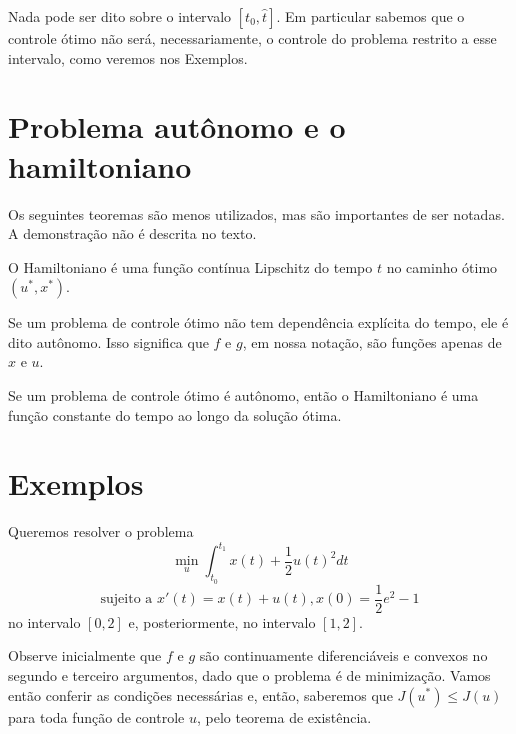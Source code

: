 \begin{remark}
    Nada pode ser dito sobre o intervalo $[t_0, \hat{t}]$. Em particular sabemos que o controle ótimo não será, necessariamente, o controle do problema restrito a esse intervalo, como veremos nos Exemplos. 
\end{remark}

\section{Problema autônomo e o hamiltoniano}

Os seguintes teoremas são menos utilizados, mas são importantes de ser notadas. A demonstração não é descrita no texto. 

\begin{theorem}
    O Hamiltoniano é uma função contínua Lipschitz do tempo $t$ no caminho
    ótimo $(u^*, x^*)$. 
\end{theorem}

\begin{definition}[Autônomo]
    Se um problema de controle ótimo não tem dependência explícita do tempo,
    ele é dito autônomo. Isso significa que $f$ e $g$, em nossa notação, são
    funções apenas de $x$ e $u$. 
\end{definition}

\begin{theorem}
    Se um problema de controle ótimo é autônomo, então o Hamiltoniano é uma
    função constante do tempo ao longo da solução ótima. 
\end{theorem}

\section{Exemplos}

\begin{example}
    Queremos resolver o problema 
    $$
    \min_u \int_{t_0}^{t_1} x(t) + \frac{1}{2}u(t)^2 dt
    $$
    $$  
    \text{sujeito a  }x'(t) = x(t) + u(t), x(0) = \frac{1}{2}e^2 - 1
    $$
    no intervalo $[0,2]$ e, posteriormente, no intervalo $[1,2]$.
\end{example}

Observe inicialmente que $f$ e $g$ são continuamente diferenciáveis e convexos no segundo 
e terceiro argumentos, dado que o problema é de minimização. Vamos então conferir as condições 
necessárias e, então, saberemos que $J(u^*) \le J(u)$ para toda função de controle $u$, pelo 
teorema de existência. 

